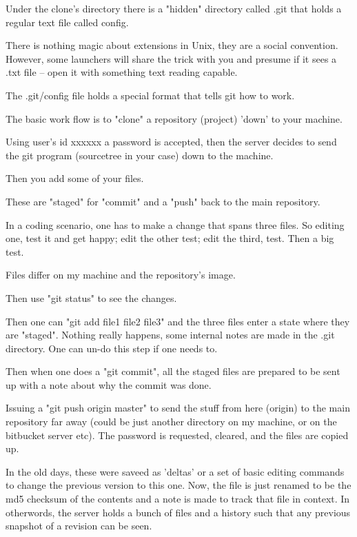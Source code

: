 Under the clone's directory there is a "hidden" directory called .git
that holds a regular text file called config.

There is nothing magic about extensions in Unix, they are a social
convention. However, some launchers will share the trick with you
and presume if it sees a .txt file -- open it with something text
reading capable.

The .git/config file holds a special format that tells git how
to work.

The basic work flow is to "clone" a repository (project) 'down'
to your machine. 


Using user's id xxxxxx a password is accepted, then
the server decides to send the git program (sourcetree
in your case) down to the machine. 

Then you add some of your files.

These are "staged" for "commit" and a "push" back to the main
repository. 

In a coding scenario, one has to make a change that spans three
files. So editing one, test it and get happy; edit the other
test; edit the third, test. Then a big test. 

Files differ on my machine and the repository's image.

Then use "git status" to see the changes.

Then one can "git add file1 file2 file3" and the three
files enter a state where they are "staged". Nothing
really happens, some internal notes are made in the
.git directory. One can un-do this step if one needs to.

Then when one does a "git commit", all the staged files are prepared to
be sent up with a note about why the commit was done.

Issuing a "git push origin master" to send the stuff from
here (origin) to the main repository far away (could be
just another directory on my machine, or on the bitbucket
server etc). The password is requested, cleared, and the
files are copied up.

In the old days, these were saveed as 'deltas' or a set
of basic editing commands to change the previous version to
this one. Now, the file is just renamed to be the md5 checksum
of the contents and a note is made to track that file in context.
In otherwords, the server holds a bunch of files and a history
such that any previous snapshot of a revision can be seen.

